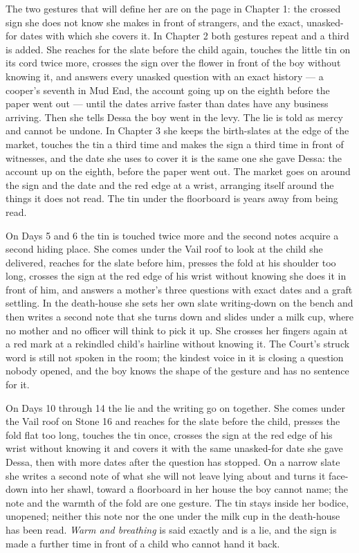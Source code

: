 \documentclass{design/chronicle}
\begin{document}
{
The two gestures that will define her are on the page in Chapter 1: the crossed sign she does not know she makes in front of strangers, and the exact, unasked-for dates with which she covers it. In Chapter 2 both gestures repeat and a third is added. She reaches for the slate before the child again, touches the little tin on its cord twice more, crosses the sign over the flower in front of the boy without knowing it, and answers every unasked question with an exact history --- a cooper’s seventh in Mud End, the account going up on the eighth before the paper went out --- until the dates arrive faster than dates have any business arriving. Then she tells Dessa the boy went in the levy. The lie is told as mercy and cannot be undone. In Chapter 3 she keeps the birth-slates at the edge of the market, touches the tin a third time and makes the sign a third time in front of witnesses, and the date she uses to cover it is the same one she gave Dessa: the account up on the eighth, before the paper went out. The market goes on around the sign and the date and the red edge at a wrist, arranging itself around the things it does not read. The tin under the floorboard is years away from being read.

On Days 5 and 6 the tin is touched twice more and the second notes acquire a second hiding place. She comes under the Vail roof to look at the child she delivered, reaches for the slate before him, presses the fold at his shoulder too long, crosses the sign at the red edge of his wrist without knowing she does it in front of him, and answers a mother’s three questions with exact dates and a graft settling. In the death-house she sets her own slate writing-down on the bench and then writes a second note that she turns down and slides under a milk cup, where no mother and no officer will think to pick it up. She crosses her fingers again at a red mark at a rekindled child’s hairline without knowing it. The Court’s struck word is still not spoken in the room; the kindest voice in it is closing a question nobody opened, and the boy knows the shape of the gesture and has no sentence for it.

On Days 10 through 14 the lie and the writing go on together. She comes under the Vail roof on Stone 16 and reaches for the slate before the child, presses the fold flat too long, touches the tin once, crosses the sign at the red edge of his wrist without knowing it and covers it with the same unasked-for date she gave Dessa, then with more dates after the question has stopped. On a narrow slate she writes a second note of what she will not leave lying about and turns it face-down into her shawl, toward a floorboard in her house the boy cannot name; the note and the warmth of the fold are one gesture. The tin stays inside her bodice, unopened; neither this note nor the one under the milk cup in the death-house has been read. \emph{Warm and breathing} is said exactly and is a lie, and the sign is made a further time in front of a child who cannot hand it back.

}
\end{document}
